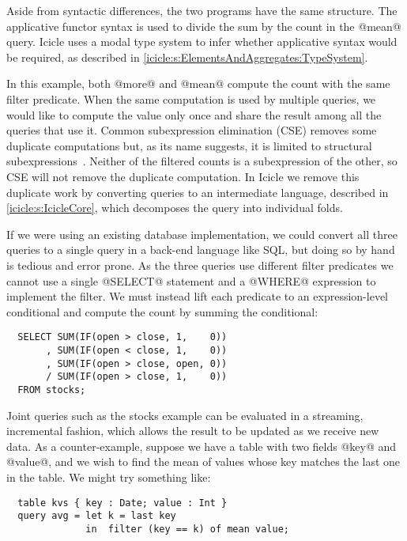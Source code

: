 Aside from syntactic differences, the two programs have the same structure.
The applicative functor syntax is used to divide the sum by the count in the @mean@ query.
Icicle uses a modal type system to infer whether applicative syntax would be required, as described in \autoref{icicle:s:ElementsAndAggregates:TypeSystem}.

In this example, both @more@ and @mean@ compute the count with the same filter predicate.
When the same computation is used by multiple queries, we would like to compute the value only once and share the result among all the queries that use it.
Common subexpression elimination (CSE) removes some duplicate computations but, as its name suggests, it is limited to structural subexpressions~\cite{chitil1997uncommon}.
Neither of the filtered counts is a subexpression of the other, so CSE will not remove the duplicate computation.
In Icicle we remove this duplicate work by converting queries to an intermediate language, described in \autoref{icicle:s:IcicleCore}, which decomposes the query into individual folds.

If we were using an existing database implementation, we could convert all three queries to a single query in a back-end language like SQL, but doing so by hand is tedious and error prone.
As the three queries use different filter predicates we cannot use a single @SELECT@ statement and a @WHERE@ expression to implement the filter.
We must instead lift each predicate to an expression-level conditional and compute the count by summing the conditional:
\begin{lstlisting}
  SELECT SUM(IF(open > close, 1,    0))
       , SUM(IF(open < close, 1,    0))
       , SUM(IF(open > close, open, 0))
       / SUM(IF(open > close, 1,    0))
  FROM stocks;
\end{lstlisting}


Joint queries such as the stocks example can be evaluated in a streaming, incremental fashion, which allows the result to be updated as we receive new data.
As a counter-example, suppose we have a table with two fields @key@ and @value@, and we wish to find the mean of values whose key matches the last one in the table.
We might try something like:
\begin{lstlisting}
  table kvs { key : Date; value : Int }
  query avg = let k = last key
              in  filter (key == k) of mean value;
\end{lstlisting}

